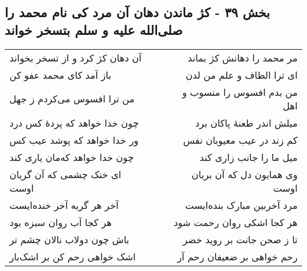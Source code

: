 \begin{center}
\section*{بخش ۳۹ - کژ ماندن دهان آن مرد کی نام محمد را صلی‌الله علیه و سلم بتسخر خواند}
\label{sec:sh039}
\begin{longtable}{l p{0.5cm} r}
آن دهان کژ کرد و از تسخر بخواند
&&
مر محمد را دهانش کژ بماند
\\
باز آمد کای محمد عفو کن
&&
ای ترا الطاف و علم من لدن
\\
من ترا افسوس می‌کردم ز جهل
&&
من بدم افسوس را منسوب و اهل
\\
چون خدا خواهد که پردهٔ کس درد
&&
میلش اندر طعنهٔ پاکان برد
\\
ور خدا خواهد که پوشد عیب کس
&&
کم زند در عیب معیوبان نفس
\\
چون خدا خواهد که‌مان یاری کند
&&
میل ما را جانب زاری کند
\\
ای خنک چشمی که آن گریان اوست
&&
وی همایون دل که آن بریان اوست
\\
آخر هر گریه آخر خنده‌ایست
&&
مرد آخربین مبارک بنده‌ایست
\\
هر کجا آب روان سبزه بود
&&
هر کجا اشکی روان رحمت شود
\\
باش چون دولاب نالان چشم تر
&&
تا ز صحن جانت بر روید خضر
\\
اشک خواهی رحم کن بر اشک‌بار
&&
رحم خواهی بر ضعیفان رحم آر
\\
\end{longtable}
\end{center}
